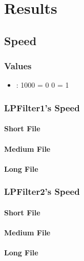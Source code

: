 \chapter{Results}

\section{Speed}

\subsection{Values}

\begin{itemize}
	\item : 1000 = 0 0 = 1

\end{itemize}

\subsection{LPFilter1's Speed}

\subsubsection{Short File}

\subsubsection{Medium File}

\subsubsection{Long File}

\subsection{LPFilter2's Speed}

\subsubsection{Short File}

\subsubsection{Medium File}

\subsubsection{Long File}

